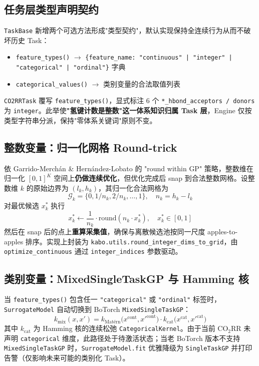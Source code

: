 \documentclass[12pt,a4paper]{article}
\newcommand{\brk}{\discretionary{}{}{}}
\begin{document}
\subsection{任务层类型声明契约}

\texttt{TaskBase} 新增两个可选方法形成"类型契约"，默认实现保持全连续行为从而不破坏历史 Task：

\begin{itemize}
    \item \texttt{feature\_types()} $\rightarrow$ \texttt{\{feature\_name: "continuous" | "integer" | "categorical" | "ordinal"\}} 字典
    \item \texttt{categorical\_values()} $\rightarrow$ 类别变量的合法取值列表
\end{itemize}

\texttt{CO2RRTask} 覆写 \texttt{feature\_types()}，显式标注 6 个 \texttt{*\_hbond\_acceptors / donors} 为 \texttt{integer}。此举使\textbf{"氢键计数是整数"这一体系知识归属 Task 层}，Engine 仅按类型字符串分派，保持"零体系关键词"原则不变。

\subsection{整数变量：归一化网格 Round-trick}

依 Garrido-Merch\'{a}n \& Hern\'{a}ndez-Lobato\cite{garrido2020round} 的 "round within GP" 策略，整数维在归一化 $[0, 1]^K$ 空间上\textbf{仍做连续优化}，但优化完成后 snap 到合法整数网格。设整数维 $k$ 的原始边界为 $(l_k, h_k)$，其归一化合法网格为
\begin{equation}
    \mathcal{G}_k = \{0, 1/n_k, 2/n_k, \ldots, 1\}, \quad n_k = h_k - l_k
\end{equation}
对最优候选 $x^*_k$ 执行
\begin{equation}
    x^*_k \leftarrow \frac{1}{n_k} \cdot \mathrm{round}(n_k \cdot x^*_k), \quad x^*_k \in [0, 1]
\end{equation}
然后在 snap 后的点上\textbf{重算采集值}，确保与离散候选池按同一尺度 apples-to-apples 排序。实现上封装为 \texttt{kabo.utils.round\_integer\_\brk dims\_\brk to\_\brk grid}，由 \texttt{optimize\_continuous} 通过 \texttt{integer\_indices} 参数驱动。

\subsection{类别变量：MixedSingleTaskGP 与 Hamming 核}

当 \texttt{feature\_types()} 包含任一 \texttt{"categorical"} 或 \texttt{"ordinal"} 标签时，\texttt{SurrogateModel} 自动切换到 BoTorch \texttt{MixedSingleTaskGP}\cite{ru2020cocabo}：
\begin{equation}
    k_{\text{mix}}(x, x') = k_{\text{Mat\'{e}rn}}\bigl(x^{\text{cont}}, x'^{\text{cont}}\bigr) \cdot k_{\text{cat}}\bigl(x^{\text{cat}}, x'^{\text{cat}}\bigr)
\end{equation}
其中 $k_{\text{cat}}$ 为 Hamming 核的连续松弛 \texttt{CategoricalKernel}。由于当前 CO$_2$RR 未声明 \texttt{categorical} 维度，此路径处于待激活状态；当老 BoTorch 版本不支持 \texttt{MixedSingleTaskGP} 时，\texttt{SurrogateModel.fit} 优雅降级为 \texttt{SingleTaskGP} 并打印告警（仅影响未来可能的类别化 Task）。
\end{document}
